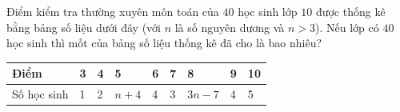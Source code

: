 \begin{ex}%
	Điểm kiểm tra thường xuyên môn toán của $40$ học sinh lớp $10$ được thống kê bằng bảng số liệu dưới đây (với $n$ là số nguyên dương và $n>3$). Nếu lớp có $40$ học sinh thì mốt của bảng số liệu thống kê đã cho là bao nhiêu?
	\begin{center}
		\begin{tabular}{|m{2cm}|m{1cm}|m{1cm}|m{1cm}|m{1cm}|m{1cm}|m{1cm}|m{1cm}|m{1cm}|}
			\hline
			Điểm & 3& 4& 5& 6& 7& 8& 9& 10\\
			\hline
			Số học sinh & 1& 2& $n+4$ & 4& 3& $3n-7$ & 4& 5\\
			\hline
		\end{tabular}
	\end{center}
\end{ex}


